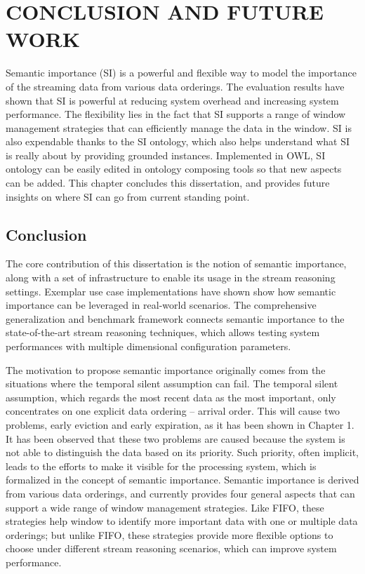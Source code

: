  
\chapter{CONCLUSION AND FUTURE WORK}
Semantic importance (SI) is a powerful and flexible way to model the importance of the streaming data from various data orderings.
The evaluation results have shown that SI is powerful at reducing system overhead and increasing system performance. 
The flexibility lies in the fact that SI supports a range of window management strategies that can efficiently manage the data in the window. 
SI is also expendable thanks to the SI ontology, which also helps understand what SI is really about by providing grounded instances.
Implemented in OWL, SI ontology can be easily edited in ontology composing tools so that new aspects can be added. 
This chapter concludes this dissertation, and provides future insights on where SI can go from current standing point. 
%
\section{Conclusion}
The core contribution of this dissertation is the notion of semantic importance, along with a set of infrastructure to enable its usage in the stream reasoning settings.
Exemplar use case implementations have shown show how semantic importance can be leveraged in real-world scenarios.
The comprehensive generalization and benchmark framework connects semantic importance to the state-of-the-art stream reasoning techniques, which allows testing system performances with multiple dimensional configuration parameters.

The motivation to propose semantic importance originally comes from the situations where the temporal silent assumption can fail.
The temporal silent assumption, which regards the most recent data as the most important, only concentrates on one explicit data ordering -- arrival order. 
This will cause two problems, early eviction and early expiration, as it has been shown in Chapter 1.
It has been observed that these two problems are caused because the system is not able to distinguish the data based on its priority. 
Such priority, often implicit, leads to the efforts to make it visible for the processing system, which is formalized in the concept of semantic importance.
Semantic importance is derived from various data orderings, and currently provides four general aspects that can support a wide range of window management strategies.
Like FIFO, these strategies help window to identify more important data with one or multiple data orderings; but unlike FIFO, these strategies provide more flexible options to choose under different stream reasoning scenarios, which can improve system performance.

